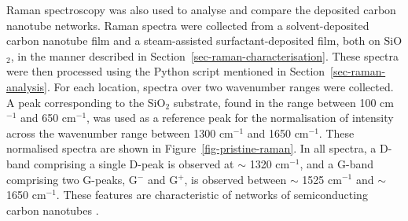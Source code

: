 \documentclass[
  a4paper,
]{scrbook}
\begin{document}
Raman spectroscopy was also used to analyse and compare the deposited
carbon nanotube networks. Raman spectra were collected from a
solvent-deposited carbon nanotube film and a steam-assisted
surfactant-deposited film, both on SiO\(_2\), in the manner described in
Section~\ref{sec-raman-characterisation}. These spectra were then
processed using the Python script mentioned in
Section~\ref{sec-raman-analysis}. For each location, spectra over two
wavenumber ranges were collected. A peak corresponding to the SiO\(_2\)
substrate, found in the range between 100 cm\(^{-1}\) and 650
cm\(^{-1}\), was used as a reference peak for the normalisation of
intensity across the wavenumber range between 1300 cm\(^{-1}\) and 1650
cm\(^{-1}\). These normalised spectra are shown in
Figure~\ref{fig-pristine-raman}. In all spectra, a D-band comprising a
single D-peak is observed at \(\sim\) 1320 cm\(^{-1}\), and a G-band
comprising two G-peaks, G\(^-\) and G\(^+\), is observed between
\(\sim\) 1525 cm\(^{-1}\) and \(\sim\) 1650 cm\(^{-1}\). These features
are characteristic of networks of semiconducting carbon nanotubes
\autocite{Dresselhaus2005,King2014}.
\end{document}
